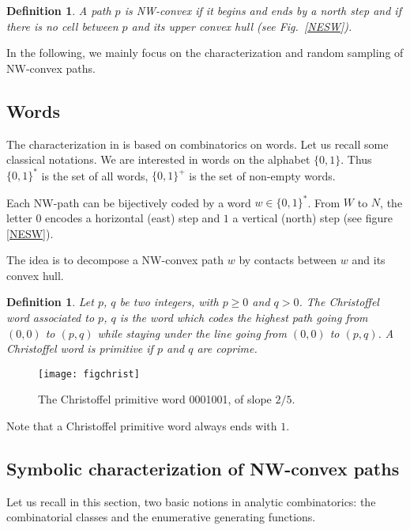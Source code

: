 \documentclass{article}
\newtheorem{definition}[theorem]{Definition}
\begin{document}
\begin{definition}
A path $p$ is \emph{NW-convex} if it begins and ends by a north step and
if there is no cell between $p$ and its upper convex hull (see Fig.~\ref{NESW}).
\end{definition}

In the following, we mainly focus on the characterization and random sampling of NW-convex paths.

\subsection{Words}
The characterization in \cite{Brlek09a} is based on
combinatorics on words. Let us recall some classical notations.
We are interested in words on the alphabet $\{0,1\}$.  Thus
$\{0,1\}^{*}$ is the set of all words, $\{0,1\}^{+}$ is the set of
non-empty words. 


Each NW-path can be bijectively coded by a word $w\in\{0,1\}^*$. From $W$ to $N$, the letter $0$ encodes a horizontal (east) step and $1$ a
vertical (north) step (see figure \ref{NESW}).


The idea is to decompose a NW-convex path $w$ by contacts between $w$ and its convex hull.


\begin{definition}
Let $p$, $q$ be two integers, with $p\geq 0$ and  $q> 0$. The Christoffel word associated to $p$, $q$ is the word which codes the highest path going from $(0,0)$ to $(p,q)$ while staying under the line going from $(0,0)$ to $(p,q)$. 
A Christoffel word is primitive if $p$ and $q$ are coprime. \end{definition}
\vspace{-0.6cm}
\begin{figure}
\begin{center}
\texttt{[image: figchrist]}
\end{center}
\caption{The Christoffel primitive word 0001001, of slope $2/5$.}
\label{dessinchrist}
\end{figure}
\vspace{-0.4cm}
Note that a Christoffel primitive word always ends with $1$. 


\subsection{Symbolic characterization of NW-convex paths}

Let us recall in this section, two basic notions in analytic combinatorics: the combinatorial classes and the enumerative generating functions.
\end{document}
